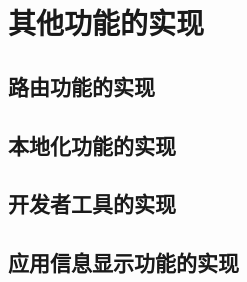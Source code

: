 

\section{其他功能的实现}\label{sec:other}

\subsection{路由功能的实现}\label{subsec:router}


\subsection{本地化功能的实现}\label{subsec:l10n}


\subsection{开发者工具的实现}\label{subsec:dev-tools}


\subsection{应用信息显示功能的实现}\label{subsec:about}

